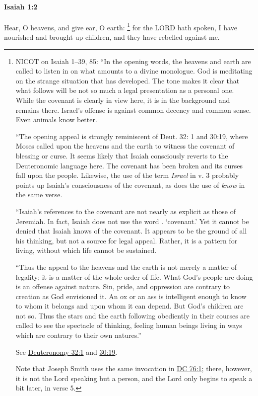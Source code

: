 		\paragraph{Isaiah 1:2} %
			\label{ISAIAH-1-2}

			Hear, O heavens, and give ear, O earth:%
				\footnote{%
					NICOT on Isaiah 1--39, 85: ``In the opening words, the heavens and earth are called to listen in on what amounts to a divine monologue. God is meditating on the strange situation that has developed. The tone makes it clear that what follows will be not so much a legal presentation as a personal one. While the covenant is clearly in view here, it is in the background and remains there. Israel's offense is against common decency and common sense. Even animals know better.
					
					``The opening appeal is strongly reminiscent of Deut. 32: 1 and 30:19, where Moses called upon the heavens and the earth to witness the covenant of blessing or curse. It seems likely that Isaiah consciously reverts to the Deuteronomic language here. The covenant has been broken and its curses fall upon the people. Likewise, the use of the term \textit{Israel} in v. 3 probably points up Isaiah's consciousness of the covenant, as does the use of \textit{know} in the same verse.
					
					``Isaiah's references to the covenant are not nearly as explicit as those of Jeremiah. In fact, Isaiah does not use the word \hyperref[BERIT]{}. `covenant.' Yet it cannot be denied that Isaiah knows of the covenant. It appears to be the ground of all his thinking, but not a source for legal appeal. Rather, it is a pattern for living, without which life cannot be sustained.
					
					``Thus the appeal to the heavens and the earth is not merely a matter of legality; it is a matter of the whole order of life. What God's people are doing is an offense against nature. Sin, pride, and oppression are contrary to creation as God envisioned it. An ox or an ass is intelligent enough to know to whom it belongs and upon whom it can depend. But God's children are not so. Thus the stars and the earth following obediently in their courses are called to see the spectacle of thinking, feeling human beings living in ways which are contrary to their own natures.''
					
					See \hyperref[DEUTERONOMY-32-1]{Deuteronomy 32:1} and \hyperref[DEUTERONOMY-30-19]{30:19}.
					
					Note that Joseph Smith uses the same invocation in \hyperref[DC76-1]{DC 76:1}; there, however, it is not the Lord speaking but a person, and the Lord only begins to speak a bit later, in verse 5.
					}
			for the LORD hath spoken, I have nourished and brought up children, and they have rebelled against me.

